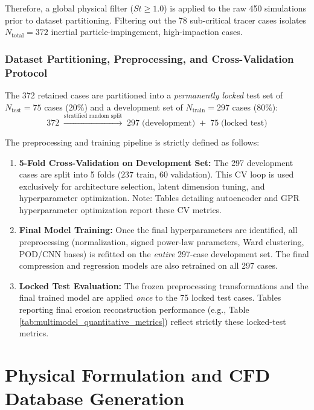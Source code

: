 \documentclass{article}
\begin{document}
Therefore, a global physical filter ($St \ge 1.0$) is applied to the raw 450 simulations prior to dataset partitioning. Filtering out the 78 sub-critical tracer cases isolates $N_{\text{total}} = 372$ inertial particle-impingement, high-impaction cases.

\subsubsection{Dataset Partitioning, Preprocessing, and Cross-Validation Protocol}
\label{sec:cv_protocol}
The 372 retained cases are partitioned into a \textit{permanently locked} test set of $N_{\text{test}} = 75$ cases ($20\%$) and a development set of $N_{\text{train}} = 297$ cases ($80\%$):
\begin{equation}
    372 \;\xrightarrow{\text{stratified random split}}\; 297\;\text{(development)} \;+\; 75\;\text{(locked test)}
\end{equation}

The preprocessing and training pipeline is strictly defined as follows:
\begin{enumerate}
    \item \textbf{5-Fold Cross-Validation on Development Set:} The 297 development cases are split into 5 folds ($237$ train, $60$ validation). This CV loop is used exclusively for architecture selection, latent dimension tuning, and hyperparameter optimization. Note: Tables detailing autoencoder and GPR hyperparameter optimization report these CV metrics.
    \item \textbf{Final Model Training:} Once the final hyperparameters are identified, all preprocessing (normalization, signed power-law parameters, Ward clustering, POD/CNN bases) is refitted on the \textit{entire} 297-case development set. The final compression and regression models are also retrained on all 297 cases.
    \item \textbf{Locked Test Evaluation:} The frozen preprocessing transformations and the final trained model are applied \textit{once} to the 75 locked test cases. Tables reporting final erosion reconstruction performance (e.g., Table \ref{tab:multimodel_quantitative_metrics}) reflect strictly these locked-test metrics.
\end{enumerate}


\section{Physical Formulation and CFD Database Generation}
\label{sec:cfd_database}
\end{document}
